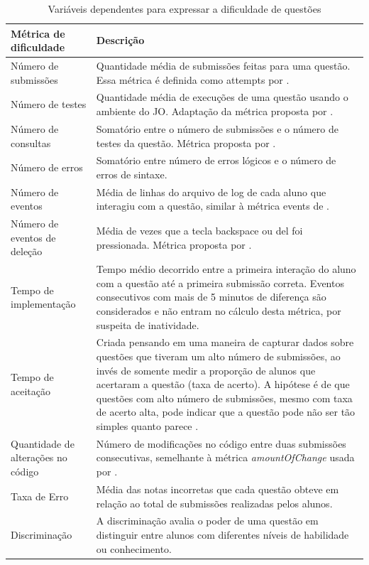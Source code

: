 \documentclass[12pt]{article}
\begin{document}
\begin{table}[!h]
    \centering
    \scriptsize
    \caption{Variáveis dependentes para expressar a dificuldade de questões}
    \label{tab:metricas_dificuldade}
    \begin{tabular}{L{.2\textwidth}L{.75\textwidth}}
        \toprule
        \textbf{Métrica de dificuldade}             & \textbf{Descrição} \\ \toprule
        Número de submissões               & Quantidade média de submissões feitas para uma questão. Essa métrica é definida como attempts por \cite{marcos2021}.       \\ \hline
        Número de testes                   & Quantidade média de execuções de uma questão usando o ambiente do JO. Adaptação da métrica proposta por \cite{elrik2022}.        \\ \hline
        Número de consultas                & Somatório entre o número de submissões e o número de testes da questão. Métrica proposta por \cite{elrik2022}.       \\ \hline
        Número de erros                    & Somatório entre número de erros lógicos e o número de erros de sintaxe.        \\ \hline
        Número de eventos                  & Média de linhas do arquivo de log de cada aluno que interagiu com a questão, similar à métrica events de \cite{marcos2021}.       \\ \hline
        Número de eventos de deleção       & Média de vezes que a tecla backspace ou del foi pressionada. Métrica proposta por \cite{marcos2021}.        \\ \hline
        Tempo de implementação             & Tempo médio decorrido entre a primeira interação do aluno com a questão até a primeira submissão correta. Eventos consecutivos com mais de 5 minutos de diferença são considerados e não entram no cálculo desta métrica, por suspeita de inatividade.        \\ \hline
        Tempo de aceitação             & Criada pensando em uma maneira de capturar dados sobre questões que tiveram um alto número de submissões, ao invés de somente medir a proporção de alunos que acertaram a questão (taxa de acerto). A hipótese é de que questões com alto número de submissões, mesmo com taxa de acerto alta, pode indicar que a questão pode
        não ser tão simples quanto parece \cite{jackson2023}.
                \\ \hline
        Quantidade de alterações no código & Número de modificações no código entre duas submissões consecutivas, semelhante à métrica \textit{amountOfChange} usada por \cite{marcos2021}.        \\ \hline
        Taxa de Erro                       & Média das notas incorretas que cada questão obteve em relação ao total de submissões realizadas pelos alunos.       \\ \hline
        Discriminação                      & A discriminação avalia o poder de uma questão em distinguir entre alunos com diferentes níveis de habilidade ou conhecimento.       \\ \bottomrule
    \end{tabular}
\end{table}
    
\end{document}
